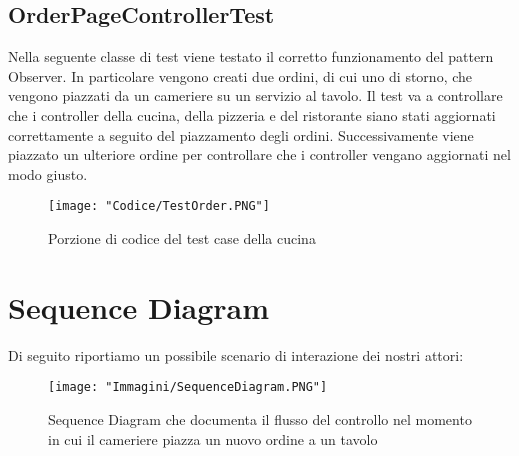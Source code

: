 \documentclass{article}
\begin{document}
\newpage

\subsection{OrderPageControllerTest}

Nella seguente classe di test viene testato il corretto funzionamento del pattern Observer. In particolare vengono creati due ordini, di cui uno di storno, che vengono piazzati da un cameriere su un servizio al tavolo. Il test va a controllare che i controller della cucina, della pizzeria e del ristorante siano stati aggiornati correttamente a seguito del piazzamento degli ordini. Successivamente viene piazzato un ulteriore ordine per controllare che i controller vengano aggiornati nel modo giusto.

\begin{figure}[!h]
\centering
\texttt{[image: "Codice/TestOrder.PNG"]}
\caption{Porzione di codice del test case della cucina}
\end{figure}

\newpage

\section{Sequence Diagram}
Di seguito riportiamo un possibile scenario di interazione dei nostri attori:

\begin{figure}[!h]
\centering
\texttt{[image: "Immagini/SequenceDiagram.PNG"]}
\caption{Sequence Diagram che documenta il flusso del controllo nel momento in cui il cameriere piazza un nuovo ordine a un tavolo}
\label{SequenceDiagram}
\end{figure}
\end{document}
